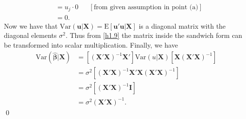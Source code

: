 \documentclass[10pt]{article}
\newcommand{\E}{\text{E}}
\newcommand{\V}{\text{Var}}
\begin{document}
\begin{enumerate}
\begin{align*}
    &=u_j\cdot 0& &[\text{from given assumption in point (a)}]\\
    &=0.
\end{align*}
Now we have that $\V({\textbf{u}}|\textbf{X})=\E[\mathbf{u'u}|\textbf{X}]$ is a diagonal matrix with the diagonal elements $\sigma^2$. Thus from \eqref{h1.9} the matrix inside the sandwich form can be transformed into scalar multiplication. Finally, we have
\begin{align*}
    \V(\hat{\pmb{\beta}}|\textbf{X})&=[(\mathbf{X'X})^{-1}\mathbf{X'}]\V({u}|\textbf{X})[\textbf{X}(\mathbf{X'X})^{-1}] \\
    &=\sigma^2[(\mathbf{X'X})^{-1}\mathbf{X'}\textbf{X}(\mathbf{X'X})^{-1}] \\
    &=\sigma^2[(\mathbf{X'X})^{-1}\textbf{I}] \\
    &=\sigma^2(\mathbf{X'X})^{-1}.
\end{align*}\qed
\end{enumerate}
\end{document}
